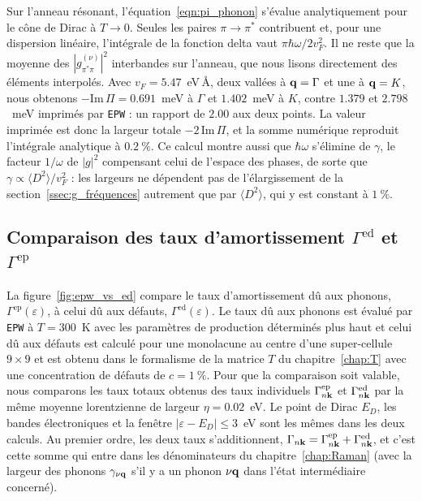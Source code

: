 Sur l'anneau résonant, l'équation~\eqref{eqn:pi_phonon} s'évalue analytiquement pour le cône de Dirac à $T\to 0$. Seules les paires $\pi\to\pi^*$ contribuent et, pour une dispersion linéaire, l'intégrale de la fonction delta vaut $\pi\hbar\omega/2v_F^2$. Il ne reste que la moyenne des $|g^{(\nu)}_{\pi^*\pi}|^2$ interbandes sur l'anneau, que nous lisons directement des éléments interpolés. Avec $v_F=5.47$~eV\,\AA{}, deux vallées à $\mathbf{q}=\Gamma$ et une à $\mathbf{q}=K$, nous obtenons $-\mathrm{Im}\,\Pi=0.691$~meV à $\Gamma$ et $1.402$~meV à $K$, contre $1.379$ et $2.798$~meV imprimés par \texttt{EPW} : un rapport de $2.00$ aux deux points. La valeur imprimée est donc la largeur totale $-2\,\mathrm{Im}\,\Pi$, et la somme numérique reproduit l'intégrale analytique à $0.2~\%$. Ce calcul montre aussi que $\hbar\omega$ s'élimine de $\gamma$, le facteur $1/\omega$ de $|g|^2$ compensant celui de l'espace des phases, de sorte que $\gamma\propto\langle D^2\rangle/v_F^2$ : les largeurs ne dépendent pas de l'élargissement de la section~\ref{ssec:g_fréquences} autrement que par $\langle D^2\rangle$, qui y est constant à $1~\%$.

\clearpage
\subsection{Comparaison des taux d'amortissement $\Gamma^\text{ed}$ et $\Gamma^\text{ep}$}\label{sec:g_comparaison}

La figure~\ref{fig:epw_vs_ed} compare le taux d'amortissement dû aux phonons, $\Gamma^\text{ep}(\varepsilon)$, à celui dû aux défauts, $\Gamma^\text{ed}(\varepsilon)$. Le taux dû aux phonons est évalué par \texttt{EPW} à $T=300$~K avec les paramètres de production déterminés plus haut et celui dû aux défauts est calculé pour une monolacune au centre d'une super-cellule $9\times 9$ et est obtenu dans le formalisme de la matrice $T$ du chapitre~\ref{chap:T} avec une concentration de défauts de $c=1~\%$. Pour que la comparaison soit valable, nous comparons les taux totaux obtenus des taux individuels $\Gamma^\text{ep}_{n\mathbf{k}}$ et $\Gamma^\text{ed}_{n\mathbf{k}}$ par la même moyenne lorentzienne de largeur $\eta=0.02$~eV. Le point de Dirac $E_D$, les bandes électroniques et la fenêtre $|\varepsilon-E_D|\leq 3$~eV sont les mêmes dans les deux calculs. Au premier ordre, les deux taux s'additionnent, $\Gamma_{n\mathbf{k}}=\Gamma^\text{ep}_{n\mathbf{k}}+\Gamma_{n\mathbf{k}}^\text{ed}$, et c'est cette somme qui entre dans les dénominateurs du chapitre~\ref{chap:Raman} (avec la largeur des phonons $\gamma_{\nu\mathbf{q}}$ s'il y a un phonon $\nu\mathbf{q}$ dans l'état intermédiaire concerné).

